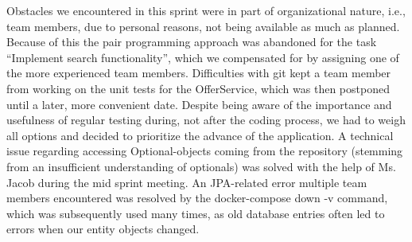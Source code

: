 Obstacles we encountered in this sprint were in part of organizational nature, i.e., team members, due to personal reasons, not being available as much as planned. Because of this the pair programming approach was abandoned for the task “Implement search functionality”, which we compensated for by assigning one of the more experienced team members. Difficulties with git kept a team member from working on the unit tests for the OfferService, which was then postponed until a later, more convenient date. Despite being aware of the importance and usefulness of regular testing during, not after the coding process, we had to weigh all options and decided to prioritize the advance of the application. A technical issue regarding accessing Optional-objects coming from the repository (stemming from an insufficient understanding of optionals) was solved with the help of Ms. Jacob during the mid sprint meeting. An JPA-related error multiple team members encountered was resolved by the docker-compose down -v command, which was subsequently used many times, as old database entries often led to errors when our entity objects changed.
